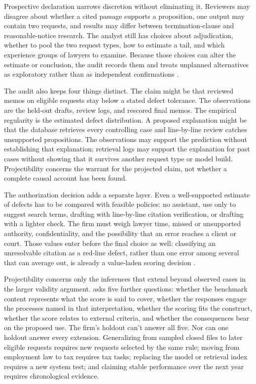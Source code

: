 \documentclass[12pt]{article}
\begin{document}
Prospective declaration narrows discretion without eliminating it. Reviewers may disagree about whether a cited passage supports a proposition, one output may contain two requests, and results may differ between termination-clause and reasonable-notice research. The analyst still has choices about adjudication, whether to pool the two request types, how to estimate a tail, and which experience groups of lawyers to examine. Because those choices can alter the estimate or conclusion, the audit records them and treats unplanned alternatives as exploratory rather than as independent confirmations \citep{GelmanLoken2013}.

The audit also keeps four things distinct. The claim might be that reviewed memos on eligible requests stay below a stated defect tolerance. The observations are the held-out drafts, review logs, and rescored final memos. The empirical regularity is the estimated defect distribution. A proposed explanation might be that the database retrieves every controlling case and line-by-line review catches unsupported propositions. The observations may support the prediction without establishing that explanation; retrieval logs may support the explanation for past cases without showing that it survives another request type or model build. Projectibility concerns the warrant for the projected claim, not whether a complete causal account has been found.

The authorization decision adds a separate layer. Even a well-supported estimate of defects has to be compared with feasible policies: no assistant, use only to suggest search terms, drafting with line-by-line citation verification, or drafting with a lighter check. The firm must weigh lawyer time, missed or unsupported authority, confidentiality, and the possibility that an error reaches a client or court. Those values enter before the final choice as well: classifying an unresolvable citation as a red-line defect, rather than one error among several that can average out, is already a value-laden scoring decision \citep[747--749]{messick1995Validity}.

Projectibility concerns only the inferences that extend beyond observed cases in the larger validity argument. \Textcite[741--747]{messick1995Validity} asks five further questions: whether the benchmark content represents what the score is said to cover, whether the responses engage the processes named in that interpretation, whether the scoring fits the construct, whether the score relates to external criteria, and whether the consequences bear on the proposed use. The firm's holdout can't answer all five. Nor can one holdout answer every extension. Generalizing from sampled closed files to later eligible requests requires new requests selected by the same rule; moving from employment law to tax requires tax tasks; replacing the model or retrieval index requires a new system test; and claiming stable performance over the next year requires chronological evidence.
\end{document}
